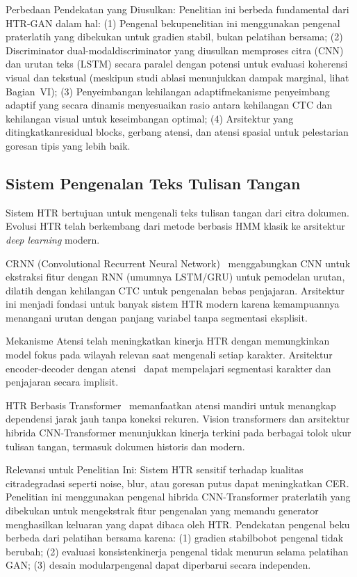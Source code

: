 \documentclass[journal]{IEEEtran}
\begin{document}
Perbedaan Pendekatan yang Diusulkan: Penelitian ini berbeda fundamental dari HTR-GAN dalam hal: (1) Pengenal beku\textemdash penelitian ini menggunakan pengenal praterlatih yang dibekukan untuk gradien stabil, bukan pelatihan bersama; (2) Discriminator dual-modal\textemdash discriminator yang diusulkan memproses citra (CNN) dan urutan teks (LSTM) secara paralel dengan potensi untuk evaluasi koherensi visual dan tekstual (meskipun studi ablasi menunjukkan dampak marginal, lihat Bagian~VI); (3) Penyeimbangan kehilangan adaptif\textemdash mekanisme penyeimbang adaptif yang secara dinamis menyesuaikan rasio antara kehilangan CTC dan kehilangan visual untuk keseimbangan optimal; (4) Arsitektur yang ditingkatkan\textemdash residual blocks, gerbang atensi, dan atensi spasial untuk pelestarian goresan tipis yang lebih baik.

\subsection{Sistem Pengenalan Teks Tulisan Tangan}

Sistem HTR bertujuan untuk mengenali teks tulisan tangan dari citra dokumen. Evolusi HTR telah berkembang dari metode berbasis HMM klasik ke arsitektur \textit{deep learning} modern.

CRNN (Convolutional Recurrent Neural Network)~\cite{shi2016crnn} menggabungkan CNN untuk ekstraksi fitur dengan RNN (umumnya LSTM/GRU) untuk pemodelan urutan, dilatih dengan kehilangan CTC untuk pengenalan bebas penjajaran. Arsitektur ini menjadi fondasi untuk banyak sistem HTR modern karena kemampuannya menangani urutan dengan panjang variabel tanpa segmentasi eksplisit.

Mekanisme Atensi telah meningkatkan kinerja HTR dengan memungkinkan model fokus pada wilayah relevan saat mengenali setiap karakter. Arsitektur encoder-decoder dengan atensi~\cite{bluche2017scan} dapat mempelajari segmentasi karakter dan penjajaran secara implisit.

HTR Berbasis Transformer~\cite{michael2019evaluating,diaz2021rethinking} memanfaatkan atensi mandiri untuk menangkap dependensi jarak jauh tanpa koneksi rekuren. Vision transformers dan arsitektur hibrida CNN-Transformer menunjukkan kinerja terkini pada berbagai tolok ukur tulisan tangan, termasuk dokumen historis dan modern.

Relevansi untuk Penelitian Ini: Sistem HTR sensitif terhadap kualitas citra\textemdash degradasi seperti noise, blur, atau goresan putus dapat meningkatkan CER. Penelitian ini menggunakan pengenal hibrida CNN-Transformer praterlatih yang dibekukan untuk mengekstrak fitur pengenalan yang memandu generator menghasilkan keluaran yang dapat dibaca oleh HTR. Pendekatan pengenal beku berbeda dari pelatihan bersama karena: (1) gradien stabil\textemdash bobot pengenal tidak berubah; (2) evaluasi konsisten\textemdash kinerja pengenal tidak menurun selama pelatihan GAN; (3) desain modular\textemdash pengenal dapat diperbarui secara independen.
\end{document}
